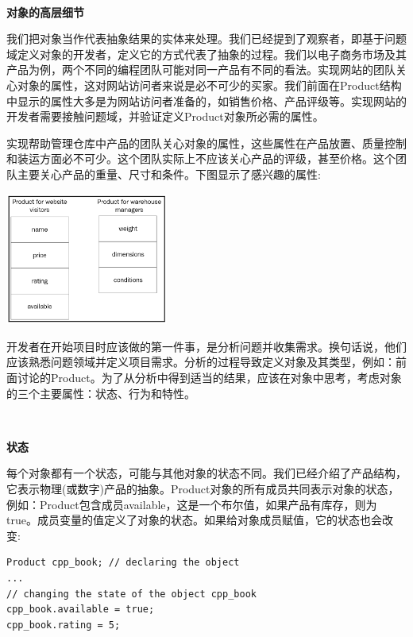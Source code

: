 \noindent\textbf{}\ \par
\textbf{对象的高层细节} \ \par
我们把对象当作代表抽象结果的实体来处理。我们已经提到了观察者，即基于问题域定义对象的开发者，定义它的方式代表了抽象的过程。我们以电子商务市场及其产品为例，两个不同的编程团队可能对同一产品有不同的看法。实现网站的团队关心对象的属性，这对网站访问者来说是必不可少的买家。我们前面在Product结构中显示的属性大多是为网站访问者准备的，如销售价格、产品评级等。实现网站的开发者需要接触问题域，并验证定义Product对象所必需的属性。 \par
实现帮助管理仓库中产品的团队关心对象的属性，这些属性在产品放置、质量控制和装运方面必不可少。这个团队实际上不应该关心产品的评级，甚至价格。这个团队主要关心产品的重量、尺寸和条件。下图显示了感兴趣的属性:\par

\begin{center}
	\includegraphics[width=0.4\textwidth]{content/Section-1/Chapter-3/3}
\end{center}

开发者在开始项目时应该做的第一件事，是分析问题并收集需求。换句话说，他们应该熟悉问题领域并定义项目需求。分析的过程导致定义对象及其类型，例如：前面讨论的Product。为了从分析中得到适当的结果，应该在对象中思考，考虑对象的三个主要属性：状态、行为和特性。\par

\noindent\textbf{}\ \par
\textbf{状态} \ \par
每个对象都有一个状态，可能与其他对象的状态不同。我们已经介绍了产品结构，它表示物理(或数字)产品的抽象。Product对象的所有成员共同表示对象的状态，例如：Product包含成员available，这是一个布尔值，如果产品有库存，则为true。成员变量的值定义了对象的状态。如果给对象成员赋值，它的状态也会改变: \par

\begin{lstlisting}[caption={}]
Product cpp_book; // declaring the object
...
// changing the state of the object cpp_book
cpp_book.available = true;
cpp_book.rating = 5;
\end{lstlisting}

